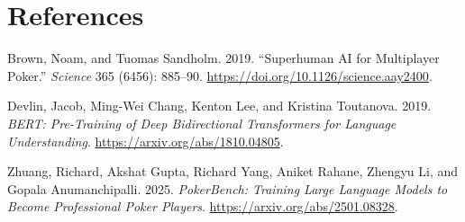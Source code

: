 \documentclass[
  11pt,
  letterpaper,
]{article}
\newlength{\cslhangindent}
\newenvironment{CSLReferences}[2] %
 {\begin{list}{}{%
  \setlength{\itemindent}{0pt}
  \setlength{\leftmargin}{0pt}
  \setlength{\parsep}{0pt}
  \ifodd #1
   \setlength{\leftmargin}{\cslhangindent}
   \setlength{\itemindent}{-1\cslhangindent}
  \fi
  \setlength{\itemsep}{#2\baselineskip}}}
 {\end{list}}
\begin{document}
\section*{References}\label{references}

\protect{}\label{refs}
\begin{CSLReferences}{1}{1}
Brown, Noam, and Tuomas Sandholm. 2019. {``Superhuman {AI} for
Multiplayer Poker.''} \emph{Science} 365 (6456): 885--90.
\url{https://doi.org/10.1126/science.aay2400}.

Devlin, Jacob, Ming-Wei Chang, Kenton Lee, and Kristina Toutanova. 2019.
\emph{{BERT}: Pre-Training of Deep Bidirectional Transformers for
Language Understanding}. \url{https://arxiv.org/abs/1810.04805}.

Zhuang, Richard, Akshat Gupta, Richard Yang, Aniket Rahane, Zhengyu Li,
and Gopala Anumanchipalli. 2025. \emph{{PokerBench}: Training Large
Language Models to Become Professional Poker Players}.
\url{https://arxiv.org/abs/2501.08328}.

\end{CSLReferences}
\end{document}
